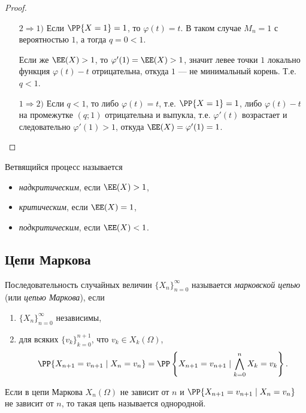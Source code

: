 \documentclass[12pt,a4paper]{article}
\begin{document}
    \begin{proof}
        \begin{itemize}
            \item[$2 \Rightarrow 1)$] Если $\PP\{X = 1\} = 1$, то $\varphi(t) = t$. В таком случае $M_n = 1$ с вероятностью $1$, а тогда $q = 0 < 1$.

                Если же $\EE(X) > 1$, то $\varphi'(1) = \EE(X) > 1$, значит левее точки $1$ локально функция $\varphi(t) - t$ отрицательна, откуда $1$ --- не минимальный корень. Т.е. $q < 1$.
            
            \item[$1 \Rightarrow 2)$] Если $q < 1$, то либо $\varphi(t) = t$, т.е. $\PP{X = 1} = 1$, либо $\varphi(t) - t$ на промежутке $(q; 1)$ отрицательна и выпукла, т.е. $\varphi'(t)$ возрастает и следовательно $\varphi'(1) > 1$, откуда $\EE(X) = \varphi'(1) = 1$.
        \end{itemize}
    \end{proof}

    \begin{definition}
        Ветвящийся процесс называется
        \begin{itemize}
            \item \emph{надкритическим}, если $\EE(X) > 1$,
            \item \emph{критическим}, если $\EE(X) = 1$,
            \item \emph{подкритическим}, если $\EE(X) < 1$.
        \end{itemize}
    \end{definition}

    \subsection{Цепи Маркова}

    \begin{definition}
        Последовательность случайных величин $\{X_n\}_{n=0}^\infty$ называется \emph{марковской цепью} (или \emph{цепью Маркова}), если
        \begin{enumerate}
            \item $\{X_n\}_{n=0}^\infty$ независимы,
            \item для всяких $\{v_k\}_{k=0}^{n+1}$, что $v_k \in X_k(\Omega)$,
                \[\PP\{X_{n+1} = v_{n+1} \mid X_n = v_n\} = \PP\left\{X_{n+1} = v_{n+1} \mid \bigwedge_{k=0}^n X_k = v_k \right\}.\]
        \end{enumerate}

        Если в цепи Маркова $X_n(\Omega)$ не зависит от $n$ и $\PP\{X_{n+1} = v_{n+1} \mid X_n = v_n\}$ не зависит от $n$, то такая цепь называется однородной.
    \end{definition}
\end{document}
